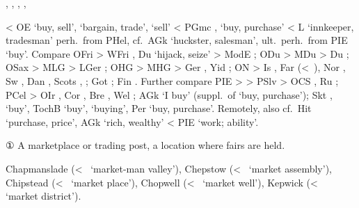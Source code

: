 \documentclass[12pt,letterpaper,oneside,article,draft]{memoir}
\begin{document}
\begin{Lemma}
\begin{Also}
	, , , , 
\end{Also}
\begin{Etymology}
		< OE  ‘buy, sell’,  ‘bargain, trade’,  ‘sell’ <
		PGmc ,  ‘buy, purchase’ < L  ‘innkeeper, tradesman’
		perh.\ from PHel, cf.\ AGk   ‘huckster, salesman’, ult.\ perh.\ from
		PIE  ‘buy’.
	Compare
	OFri  > WFri ,  Du  ‘hijack, seize’ > ModE ;
	ODu  > MDu  > Du ;
	OSax  > MLG  > LGer ;
	OHG  > MHG  > Ger , Yid  ;
	ON  > Is , Far  (<~), Nor , Sw ,
		Dan , Scots , ;
	Got  ;
	Fin .
	Further compare PIE  >  >
		PSlv  > OCS  , Ru  ;
		PCel  > OIr , Cor , Bre , Wel ;
		AGk   ‘I buy’
			(suppl.\ of   ‘buy, purchase’);
		Skt  ,   ‘buy’,
		TochB  ‘buy’,  ‘buying’,
		Per   ‘buy, purchase’.
	Remotely, also cf.\ Hit   ‘purchase, price’,
		AGk   ‘rich, wealthy’ < PIE  ‘work; ability’.
\end{Etymology}
\begin{Definitions}
	① A marketplace or trading post, a location where fairs are held.
\end{Definitions}
\begin{Examples}
	Chapmanslade (<~ ‘market-man valley’), Chepstow (<~ ‘market assembly’), Chipstead (<~ ‘market place’), Chopwell (<~ ‘market well’), Kepwick (<~ ‘market district’).
\end{Examples}
\end{Lemma}
\end{document}
